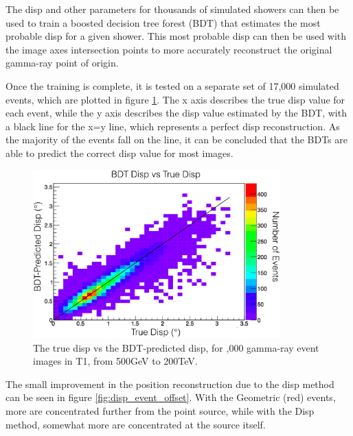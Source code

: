 The disp and other parameters for thousands of simulated showers can then be used to train a boosted decision tree forest (BDT) that estimates the most probable disp for a given shower.
This most probable disp can then be used with the image axes intersection points to more accurately reconstruct the original gamma-ray point of origin.

Once the training is complete, it is tested on a separate set of 17,000 simulated events, which are plotted in figure \ref{fig:disptraining}.
The x axis describes the true disp value for each event, while the y axis describes the disp value estimated by the BDT, with a black line for the x=y line, which represents a perfect disp reconstruction.
As the majority of the events fall on the line, it can be concluded that the BDTs are able to predict the correct disp value for most images.

\begin{figure}[ht]
  \begin{center}
    \includegraphics[width=0.85\textwidth]{images/disp_training.eps}
    \caption[Disp BDT Training]{The true disp vs the BDT-predicted disp, for ,000 gamma-ray event images in T1, from 500GeV to 200TeV.}\label{fig:disptraining}
  \end{center}
\end{figure}

The small improvement in the position reconstruction due to the disp method can be seen in figure \ref{fig:disp_event_offset}.
With the Geometric (red) events, more are concentrated further from the point source, while with the Disp method, somewhat more are concentrated at the source itself.

